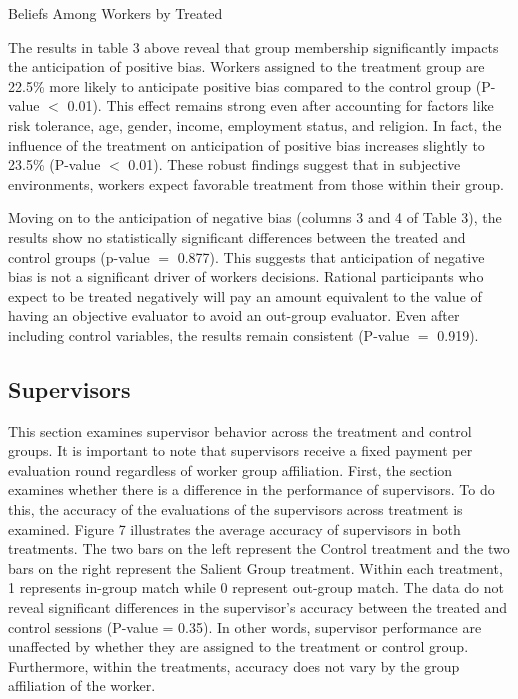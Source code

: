 \begin{table}[H]
 \captionsetup{justification=raggedright,singlelinecheck=false}
    \caption{Beliefs Among Workers by Treated }
        
\end{table}

The results in table 3 above reveal that group membership significantly impacts the anticipation of positive bias. Workers assigned to the treatment group are 22.5\% more likely to anticipate positive bias compared to the control group (P-value $<$ 0.01). This effect remains strong even after accounting for factors like risk tolerance, age, gender, income, employment status, and religion. In fact, the influence of the treatment on anticipation of positive bias increases slightly to 23.5\% (P-value $<$ 0.01). These robust findings suggest that in subjective environments, workers expect favorable treatment from those within their group.

Moving on to the anticipation of negative bias (columns 3 and 4 of Table 3), the results show no statistically significant differences between the treated and control groups (p-value $=$ 0.877). This suggests that anticipation of negative bias is not a significant driver of workers decisions. Rational participants who expect to be treated negatively will pay an amount equivalent to the value of having an objective evaluator to avoid an out-group evaluator. Even after including control variables, the results remain consistent (P-value $=$ 0.919). 

\subsection{Supervisors}
This section examines supervisor behavior across the treatment and control groups. It is important to note that supervisors receive a fixed payment per evaluation round regardless of worker group affiliation. First, the section examines whether there is a difference in the performance of supervisors. To do this, the accuracy of the evaluations of the supervisors across treatment is examined. Figure 7 illustrates the average accuracy of supervisors in both treatments. The two bars on the left represent the Control treatment and the two bars on the right represent the Salient Group treatment. Within each treatment, 1 represents in-group match while 0 represent out-group match. The data do not reveal significant differences in the supervisor's accuracy between the treated and control sessions (P-value = 0.35). In other words, supervisor performance are unaffected by whether they are  assigned to the treatment or control group. Furthermore, within the treatments, accuracy does not vary by the group affiliation of the worker. 

